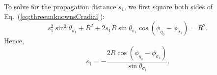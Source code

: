 \documentclass[a4paper,twocolumn,superscriptaddress]{revtex4-1}
\begin{document}
{To solve for the propagation distance $s_1$, we first square both sides of Eq.~(\ref{eq:threeunknownsCradial}):
\begin{equation}
  s_1^2 \sin^2 \theta_{ \sigma_1 }   
  +
  R^2
  + 
  2 s_1 R \sin \theta_{ \sigma_1 } \cos(\phi_{ \eta_0 }-\phi_{ \sigma_1 })
  = 
  R^2 .
\end{equation}
Hence,
\begin{equation}
\label{eq:s1soln}
  s_1
  = 
  - \frac{2 R \cos(\phi_{ \eta_0 }-\phi_{ \sigma_1 })}{\sin \theta_{ \sigma_1 } } .
\end{equation}


}
\end{document}
